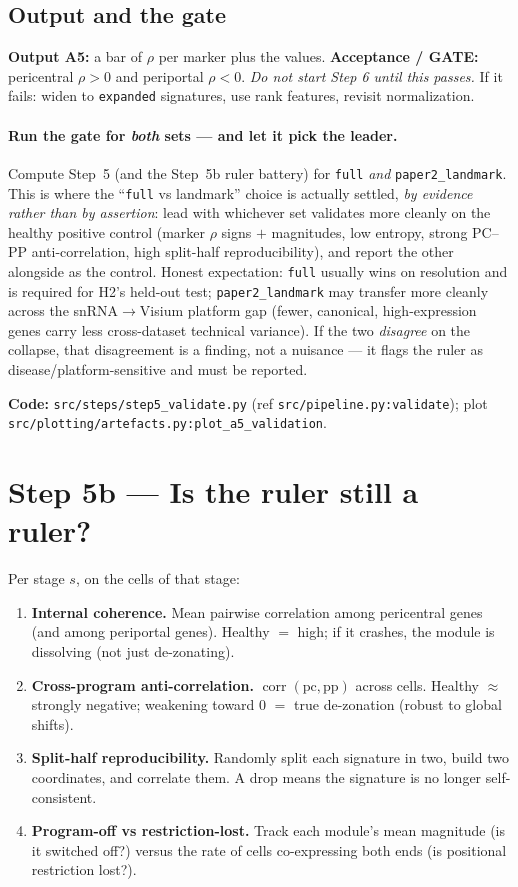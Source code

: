 \documentclass[11pt]{article}
\newcommand{\code}[1]{\texttt{\small #1}}
\begin{document}
\subsection{Output and the gate}
\textbf{Output A5:} a bar of $\rho$ per marker plus the values. \textbf{Acceptance / GATE:}
pericentral $\rho>0$ and periportal $\rho<0$. \emph{Do not start Step 6 until this passes.} If it
fails: widen to \code{expanded} signatures, use rank features, revisit normalization.

\paragraph{Run the gate for \emph{both} sets --- and let it pick the leader.} Compute Step~5 (and
the Step~5b ruler battery) for \code{full} \emph{and} \code{paper2\_landmark}. This is where the
``\code{full} vs landmark'' choice is actually settled, \emph{by evidence rather than by assertion}:
lead with whichever set validates more cleanly on the healthy positive control (marker $\rho$ signs
$+$ magnitudes, low entropy, strong PC--PP anti-correlation, high split-half reproducibility), and
report the other alongside as the control. Honest expectation: \code{full} usually wins on resolution
and is required for H2's held-out test; \code{paper2\_landmark} may transfer more cleanly across the
snRNA$\rightarrow$Visium platform gap (fewer, canonical, high-expression genes carry less
cross-dataset technical variance). If the two \emph{disagree} on the collapse, that disagreement is a
finding, not a nuisance --- it flags the ruler as disease/platform-sensitive and must be reported.

\medskip
\noindent\textbf{Code:} \code{src/steps/step5\_validate.py} (ref \code{src/pipeline.py:validate});
plot \code{src/plotting/artefacts.py:plot\_a5\_validation}.

\section{Step 5b --- Is the ruler still a ruler?}

Per stage $s$, on the cells of that stage:
\begin{enumerate}[leftmargin=1.6em]
  \item \textbf{Internal coherence.} Mean pairwise correlation among pericentral genes (and among
        periportal genes). Healthy $=$ high; if it crashes, the module is dissolving (not just
        de-zonating).
  \item \textbf{Cross-program anti-correlation.} $\operatorname{corr}(\text{pc}, \text{pp})$
        across cells. Healthy $\approx$ strongly negative; weakening toward $0$ $=$ true
        de-zonation (robust to global shifts).
  \item \textbf{Split-half reproducibility.} Randomly split each signature in two, build two
        coordinates, and correlate them. A drop means the signature is no longer self-consistent.
  \item \textbf{Program-off vs restriction-lost.} Track each module's mean magnitude (is it
        switched off?) versus the rate of cells co-expressing both ends (is positional restriction
        lost?).
\end{enumerate}
\end{document}
